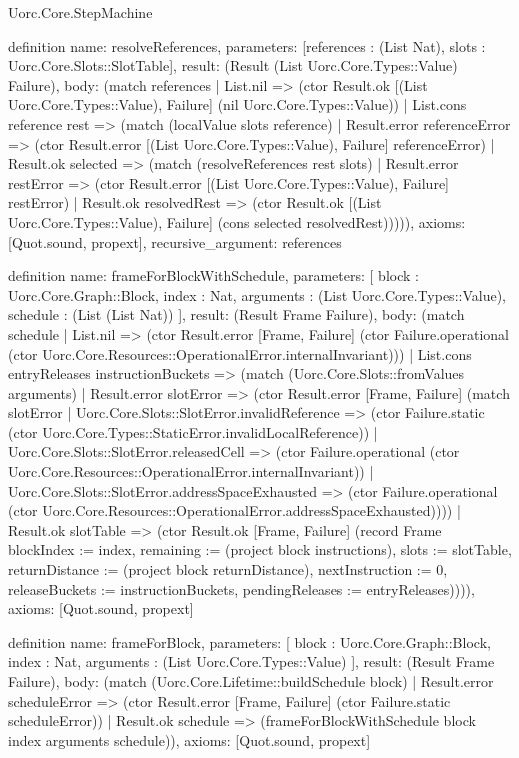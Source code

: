 \begin{lexlean}{Uorc.Core.StepMachine}
\begin{semanticmodule}
definition{
  name: resolveReferences,
  parameters: [references : (List Nat), slots : Uorc.Core.Slots::SlotTable],
  result: (Result (List Uorc.Core.Types::Value) Failure),
  body: (match references
    | List.nil => (ctor Result.ok [(List Uorc.Core.Types::Value), Failure] (nil Uorc.Core.Types::Value))
    | List.cons reference rest => (match (localValue slots reference)
      | Result.error referenceError => (ctor Result.error [(List Uorc.Core.Types::Value), Failure] referenceError)
      | Result.ok selected => (match (resolveReferences rest slots)
        | Result.error restError => (ctor Result.error [(List Uorc.Core.Types::Value), Failure] restError)
        | Result.ok resolvedRest => (ctor Result.ok [(List Uorc.Core.Types::Value), Failure] (cons selected resolvedRest))))),
  axioms: [Quot.sound, propext],
  recursive_argument: references
}

definition{
  name: frameForBlockWithSchedule,
  parameters: [
    block : Uorc.Core.Graph::Block,
    index : Nat,
    arguments : (List Uorc.Core.Types::Value),
    schedule : (List (List Nat))
  ],
  result: (Result Frame Failure),
  body: (match schedule
    | List.nil => (ctor Result.error [Frame, Failure] (ctor Failure.operational (ctor Uorc.Core.Resources::OperationalError.internalInvariant)))
    | List.cons entryReleases instructionBuckets => (match (Uorc.Core.Slots::fromValues arguments)
      | Result.error slotError => (ctor Result.error [Frame, Failure] (match slotError
        | Uorc.Core.Slots::SlotError.invalidReference => (ctor Failure.static (ctor Uorc.Core.Types::StaticError.invalidLocalReference))
        | Uorc.Core.Slots::SlotError.releasedCell => (ctor Failure.operational (ctor Uorc.Core.Resources::OperationalError.internalInvariant))
        | Uorc.Core.Slots::SlotError.addressSpaceExhausted => (ctor Failure.operational (ctor Uorc.Core.Resources::OperationalError.addressSpaceExhausted))))
      | Result.ok slotTable => (ctor Result.ok [Frame, Failure] (record Frame {blockIndex := index, remaining := (project block instructions), slots := slotTable, returnDistance := (project block returnDistance), nextInstruction := 0, releaseBuckets := instructionBuckets, pendingReleases := entryReleases})))),
  axioms: [Quot.sound, propext]
}

definition{
  name: frameForBlock,
  parameters: [
    block : Uorc.Core.Graph::Block,
    index : Nat,
    arguments : (List Uorc.Core.Types::Value)
  ],
  result: (Result Frame Failure),
  body: (match (Uorc.Core.Lifetime::buildSchedule block)
    | Result.error scheduleError => (ctor Result.error [Frame, Failure] (ctor Failure.static scheduleError))
    | Result.ok schedule => (frameForBlockWithSchedule block index arguments schedule)),
  axioms: [Quot.sound, propext]
}


\end{semanticmodule}
\end{lexlean}
